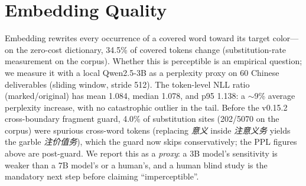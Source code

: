 \section{Embedding Quality}
\label{sec:quality}
Embedding rewrites every occurrence of a covered word toward its target
color---on the zero-cost dictionary, 34.5\% of covered tokens change
(substitution-rate measurement on the corpus). Whether this is perceptible
is an empirical question; we measure it with a local Qwen2.5-3B as a
perplexity proxy on 60 Chinese deliverables (sliding window, stride 512).
The token-level NLL ratio (marked/original) has mean 1.084, median 1.078,
and p95 1.138: a $\sim$9\% average perplexity increase, with no catastrophic
outlier in the tail. Before the v0.15.2 cross-boundary fragment guard, 4.0\% of
substitution sites (202/5070 on the corpus) were spurious
cross-word tokens (replacing \emph{意义} inside \emph{注意义务}
yields the garble \emph{注价值务}), which the guard now skips
conservatively; the PPL figures above are post-guard. We report this as
a \emph{proxy}: a 3B model's
sensitivity is weaker than a 7B model's or a human's, and a human blind
study is the mandatory next step before claiming ``imperceptible''.

